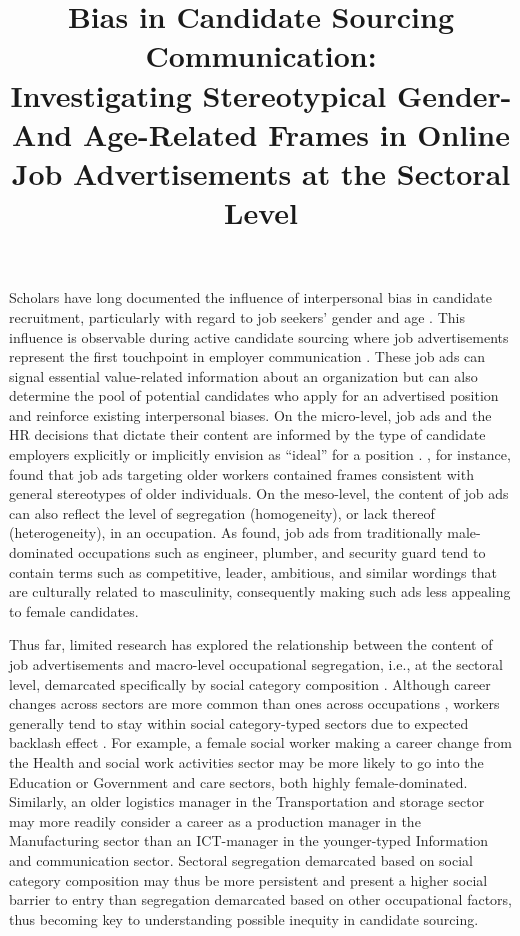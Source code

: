 \documentclass[man]{apa7}
\title{Bias in Candidate Sourcing Communication:\\
Investigating Stereotypical Gender- And Age-Related Frames in Online Job Advertisements at the Sectoral Level}
\begin{document}
\maketitle
Scholars have long documented the influence of interpersonal bias in candidate recruitment, particularly with regard to job seekers’ gender and age \parencite{beattie_possible_2012, heilman_gender_2012, paleari_when_2019}. This influence is observable during active candidate sourcing where job advertisements represent the first touchpoint in employer communication \parencite{RynesS.1989}. These job ads can signal essential value-related information about an organization \parencite{de_cooman_portraying_2012} but can also determine the pool of potential candidates who apply for an advertised position and reinforce existing interpersonal biases. On the micro-level, job ads and the HR decisions that dictate their content are informed by the type of candidate employers explicitly or implicitly envision as “ideal” for a position \parencite{kelly_gendered_2010}. \Textcite{van_selm_search_2021}, for instance, found that job ads targeting older workers contained frames consistent with general stereotypes of older individuals. On the meso-level, the content of job ads can also reflect the level of segregation (homogeneity), or lack thereof (heterogeneity), in an occupation. As \Textcite{gaucher_evidence_2011} found, job ads from traditionally male-dominated occupations such as engineer, plumber, and security guard tend to contain terms such as competitive, leader, ambitious, and similar wordings that are culturally related to masculinity, consequently making such ads less appealing to female candidates.

Thus far, limited research has explored the relationship between the content of job advertisements and macro-level occupational segregation, i.e., at the sectoral level, demarcated specifically by social category composition . Although career changes across sectors are more common than ones across occupations \parencite{carrillo-tudela_extent_2016}, workers generally tend to stay within social category-typed sectors due to expected backlash effect \parencite{fritsch_horizontal_2020}. For example, a female social worker making a career change from the Health and social work activities sector may be more likely to go into the Education or Government and care sectors, both highly female-dominated. Similarly, an older logistics manager in the Transportation and storage sector may more readily consider a career as a production manager in the Manufacturing sector than an ICT-manager in the younger-typed Information and communication sector. Sectoral segregation demarcated based on social category composition may thus be more persistent and present a higher social barrier to entry than segregation demarcated based on other occupational factors, thus becoming key to understanding possible inequity in candidate sourcing.
\end{document}
